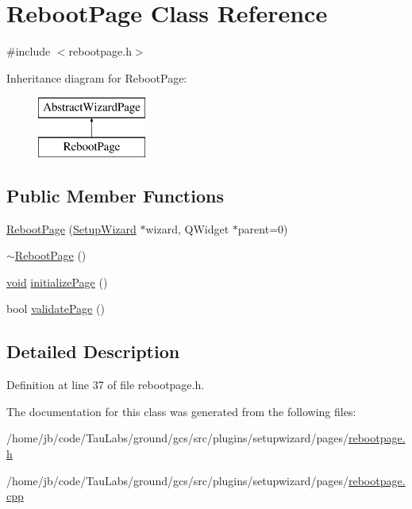 \hypertarget{class_reboot_page}{\section{\-Reboot\-Page \-Class \-Reference}
\label{class_reboot_page}
}


{\ttfamily \#include $<$rebootpage.\-h$>$}

\-Inheritance diagram for \-Reboot\-Page\-:\begin{figure}[H]
\begin{center}
\leavevmode
\includegraphics[height=2.000000cm]{class_reboot_page}
\end{center}
\end{figure}
\subsection*{\-Public \-Member \-Functions}
\begin{DoxyCompactItemize}
\item 
\hyperlink{group___reboot_page_ga555ddfd0582eb14ef5e695ab0949ad76}{\-Reboot\-Page} (\hyperlink{class_setup_wizard}{\-Setup\-Wizard} $\ast$wizard, \-Q\-Widget $\ast$parent=0)
\item 
\hyperlink{group___reboot_page_gac884b3b97511ed78d3a801cb6343bfd0}{$\sim$\-Reboot\-Page} ()
\item 
\hyperlink{group___u_a_v_objects_plugin_ga444cf2ff3f0ecbe028adce838d373f5c}{void} \hyperlink{group___reboot_page_gac953d3238347958e7bde24b139d59e2a}{initialize\-Page} ()
\item 
bool \hyperlink{group___reboot_page_ga2f844f901bd07ac2fbc496288b5f7d4b}{validate\-Page} ()
\end{DoxyCompactItemize}


\subsection{\-Detailed \-Description}


\-Definition at line 37 of file rebootpage.\-h.



\-The documentation for this class was generated from the following files\-:\begin{DoxyCompactItemize}
\item 
/home/jb/code/\-Tau\-Labs/ground/gcs/src/plugins/setupwizard/pages/\hyperlink{rebootpage_8h}{rebootpage.\-h}\item 
/home/jb/code/\-Tau\-Labs/ground/gcs/src/plugins/setupwizard/pages/\hyperlink{rebootpage_8cpp}{rebootpage.\-cpp}\end{DoxyCompactItemize}
